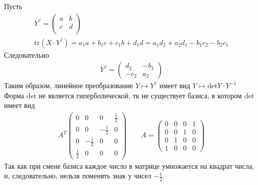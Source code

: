 Пусть 
\begin{gather*}
	Y^{?}=
	\begin{pmatrix}
	a & b \\
	c & d \\
	\end{pmatrix}
	\\
	\text{tr}\left(X \cdot Y^{?}\right) = a_1a+b_1c+c_1b+d_1d = a_1d_2+a_2d_1-b_1c_2-b_2c_1
\end{gather*}
Следовательно 
\begin{gather*}
	Y^{?}=
	\begin{pmatrix}
		d_2 & -b_2 \\
		-c_2 & a_2
	\end{pmatrix}
\end{gather*}
Таким образом, линейное преобразование $Y \mapsto Y^{?}$ имеет вид $Y \mapsto \text{det}Y \cdot Y^{-1}$\\
Форма $\text{det}$ не является гиперболической, тк не существует базиса, в котором $\text{det}$ имеет вид 
\begin{gather*}
	A^T
	\begin{pmatrix}
		0 & 0 & 0 & \frac{1}{2}\\
		0 & 0 & -\frac{1}{2} & 0\\
		0 & -\frac{1}{2} & 0 & 0\\
		\frac{1}{2} & 0 & 0 & 0
	\end{pmatrix}
	\qquad
	A =
	\begin{pmatrix}
		0 & 0 & 0 & 1\\
		0 & 0 & 1 & 0\\
		0 & 1 & 0 & 0\\
		1 & 0 & 0 & 0
	\end{pmatrix}
\end{gather*}
Так как при смене базиса каждое число в матрице умножается на квадрат числа, и, следовательно, нельзя поменять знак у чисел $-\frac{1}{2}$.